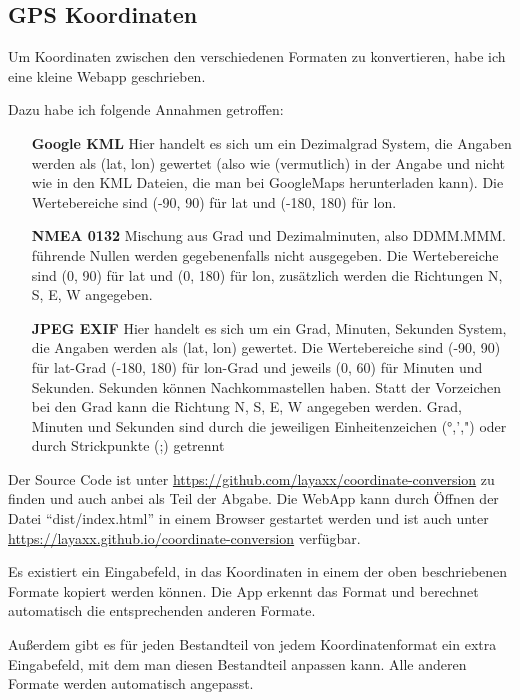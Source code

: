 \subsection{GPS Koordinaten}

Um Koordinaten zwischen den verschiedenen Formaten zu konvertieren, habe ich eine kleine Webapp geschrieben.

Dazu habe ich folgende Annahmen getroffen:

\begin{itemize}[align=left, leftmargin=*]
    \item[\textbf{Google KML}] Hier handelt es sich um ein Dezimalgrad System, die Angaben werden als (lat, lon) gewertet (also wie (vermutlich) in der Angabe und nicht wie in den KML Dateien, die man bei GoogleMaps herunterladen kann). Die Wertebereiche sind (-90, 90) für lat und (-180, 180) für lon.
    \item[\textbf{NMEA 0132}] Mischung aus Grad und Dezimalminuten, also DDMM.MMM. führende Nullen werden gegebenenfalls nicht ausgegeben. Die Wertebereiche sind (0, 90) für lat und (0, 180) für lon, zusätzlich werden die Richtungen N, S, E, W angegeben.
    \item[\textbf{JPEG EXIF}] Hier handelt es sich um ein Grad, Minuten, Sekunden System, die Angaben werden als (lat, lon) gewertet. Die Wertebereiche sind (-90, 90) für lat-Grad (-180, 180) für lon-Grad und jeweils (0, 60) für Minuten und Sekunden. Sekunden können Nachkommastellen haben. Statt der Vorzeichen bei den Grad kann die Richtung N, S, E, W angegeben werden. Grad, Minuten und Sekunden sind durch die jeweiligen Einheitenzeichen (°,',") oder durch Strickpunkte (;) getrennt
\end{itemize}

Der Source Code ist unter \url{https://github.com/layaxx/coordinate-conversion} zu finden und auch anbei als Teil der Abgabe. Die WebApp kann durch Öffnen der Datei ``dist/index.html'' in einem Browser gestartet werden und ist auch unter \url{https://layaxx.github.io/coordinate-conversion} verfügbar.

Es existiert ein Eingabefeld, in das Koordinaten in einem der oben beschriebenen Formate kopiert werden können. Die App erkennt das Format und berechnet automatisch die entsprechenden anderen Formate.

Außerdem gibt es für jeden Bestandteil von jedem Koordinatenformat ein extra Eingabefeld, mit dem man diesen Bestandteil anpassen kann. Alle anderen Formate werden automatisch angepasst.